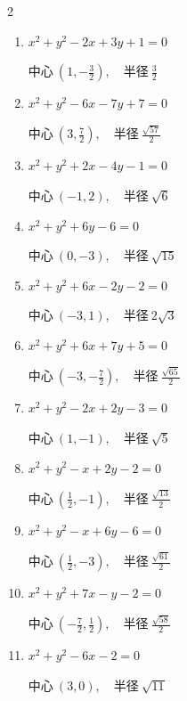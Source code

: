 \begin{multicols}{2}
\begin{enumerate}
  \item $x^{2}+y^{2}-2x+3y+1=0$

        $\displaystyle 中心\: \left(1,-\frac{3}{2}\right), \quad 半径 \ \frac{3}{2}$

\columnbreak %

  \item $x^{2}+y^{2}-6x-7y+7=0$

        $\displaystyle 中心\: \left(3,\frac{7}{2}\right), \quad 半径 \ \frac{\sqrt{57}}{2}$

  \item $x^{2}+y^{2}+2x-4y-1=0$

        $\displaystyle 中心\: \left(-1,2\right), \quad 半径 \ \sqrt{6}$

  \item $x^{2}+y^{2}+6y-6=0$

        $\displaystyle 中心\: \left(0,-3\right), \quad 半径 \ \sqrt{15}$

  \item $x^{2}+y^{2}+6x-2y-2=0$

        $\displaystyle 中心\: \left(-3,1\right), \quad 半径 \ 2\sqrt{3}$

  \item $x^{2}+y^{2}+6x+7y+5=0$

        $\displaystyle 中心\: \left(-3,-\frac{7}{2}\right), \quad 半径 \ \frac{\sqrt{65}}{2}$

  \item $x^{2}+y^{2}-2x+2y-3=0$

        $\displaystyle 中心\: \left(1,-1\right), \quad 半径 \ \sqrt{5}$

  \item $x^{2}+y^{2}-x+2y-2=0$

        $\displaystyle 中心\: \left(\frac{1}{2},-1\right), \quad 半径 \ \frac{\sqrt{13}}{2}$

  \item $x^{2}+y^{2}-x+6y-6=0$

        $\displaystyle 中心\: \left(\frac{1}{2},-3\right), \quad 半径 \ \frac{\sqrt{61}}{2}$

  \item $x^{2}+y^{2}+7x-y-2=0$

        $\displaystyle 中心\: \left(-\frac{7}{2},\frac{1}{2}\right), \quad 半径 \ \frac{\sqrt{58}}{2}$

  \item $x^{2}+y^{2}-6x-2=0$

        $\displaystyle 中心\: \left(3,0\right), \quad 半径 \ \sqrt{11}$


\end{enumerate}
\end{multicols}
